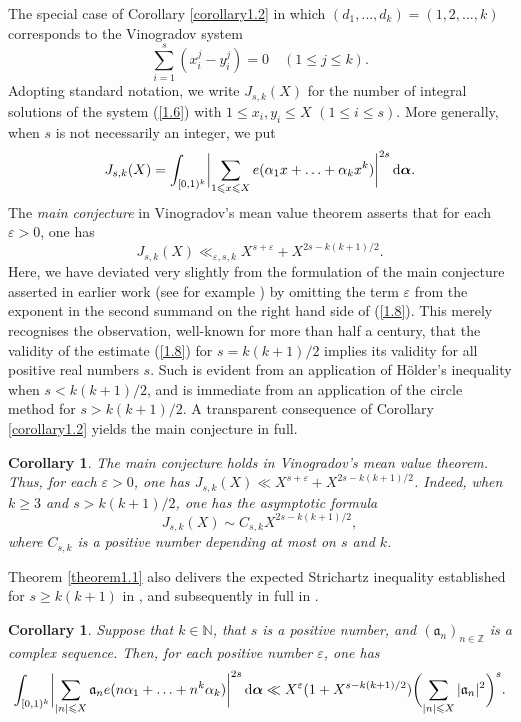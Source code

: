 \documentclass[12pt,reqno]{amsart}
\newtheorem{corollary}[theorem]{Corollary}
\theoremstyle{definition}
\theoremstyle{remark}
\numberwithin{equation}{section}
\def\dbN{{\mathbb N}} \def\dbO{{\mathbb O}} \def\dbP{{\mathbb P}}
\def\dbZ{{\mathbb Z}}\def\dbQ{{\mathbb Q}}
\def\gra{{\mathfrak a}}\def\grA{{\mathfrak A}}\def\bfgra{{\boldsymbol \gra}}
\def\alp{{\alpha}} \def\bfalp{{\boldsymbol \alpha}}
\def\eps{\varepsilon}
\def\le{\leqslant} \def\ge{\geqslant} \def\pleq{\preccurlyeq} \def\ple{\prec}
\def\d{{\,{\rm d}}}
\begin{document}
\par The special case of Corollary \ref{corollary1.2} in which $(d_1,\ldots ,d_k)=
(1,2,\ldots ,k)$ corresponds to the Vinogradov system
\begin{equation}\label{1.6}
\sum_{i=1}^s(x_i^j-y_i^j)=0\quad (1\le j\le k).
\end{equation}
Adopting standard notation, we write $J_{s,k}(X)$ for the number of integral solutions of 
the system (\ref{1.6}) with $1\le x_i,y_i\le X$ $(1\le i\le s)$. More generally, when $s$ is 
not necessarily an integer, we put
\begin{equation}\label{1.7}
J_{s,k}(X)=\int_{[0,1)^k}\biggl| \sum_{1\le x\le X}e(\alp_1x+\ldots +\alp_kx^k)
\biggr|^{2s}\d\bfalp .
\end{equation}
The {\it main conjecture} in Vinogradov's mean value theorem asserts that for each 
$\eps>0$, one has
\begin{equation}\label{1.8}
J_{s,k}(X)\ll_{\eps,s,k} X^{s+\eps}+X^{2s-k(k+1)/2}.
\end{equation}
Here, we have deviated very slightly from the formulation of the main conjecture asserted 
in earlier work (see for example \cite[equation (1.4)]{Woo2012}) by omitting the term 
$\eps$ from the exponent in the second summand on the right hand side of (\ref{1.8}). 
This merely recognises the observation, well-known for more than half a century, that the 
validity of the estimate (\ref{1.8}) for $s=k(k+1)/2$ implies its validity for all positive real 
numbers $s$. Such is evident from an application of H\"older's inequality when 
$s<k(k+1)/2$, and is immediate from an application of the circle method for $s>k(k+1)/2$. 
A transparent consequence of Corollary \ref{corollary1.2} yields the main conjecture in full.

\begin{corollary}\label{corollary1.3}
The main conjecture holds in Vinogradov's mean value theorem. Thus, for each $\eps>0$, 
one has $J_{s,k}(X)\ll X^{s+\eps}+X^{2s-k(k+1)/2}$. Indeed, when $k\ge 3$ and 
$s>k(k+1)/2$, one has the asymptotic formula
$$J_{s,k}(X)\sim C_{s,k}X^{2s-k(k+1)/2},$$
where $C_{s,k}$ is a positive number depending at most on $s$ and $k$.
\end{corollary}

Theorem \ref{theorem1.1} also delivers the expected Strichartz inequality established for 
$s\ge k(k+1)$ in \cite{Woo2017a}, and subsequently in full in \cite{BDG2016}.

\begin{corollary}\label{corollary1.4}
Suppose that $k\in \dbN$, that $s$ is a positive number, and $(\gra_n)_{n\in \dbZ}$ is a 
complex sequence. Then, for each positive number $\eps$, one has
$$\int_{[0,1)^k}\biggl| \sum_{|n|\le X}\gra_ne(n\alp_1+\ldots +n^k\alp_k)\biggr|^{2s}
\d\bfalp \ll X^\eps (1+X^{s-k(k+1)/2})\biggl( \sum_{|n|\le X}|\gra_n|^2\biggr)^s.$$
\end{corollary} 
\end{document}
